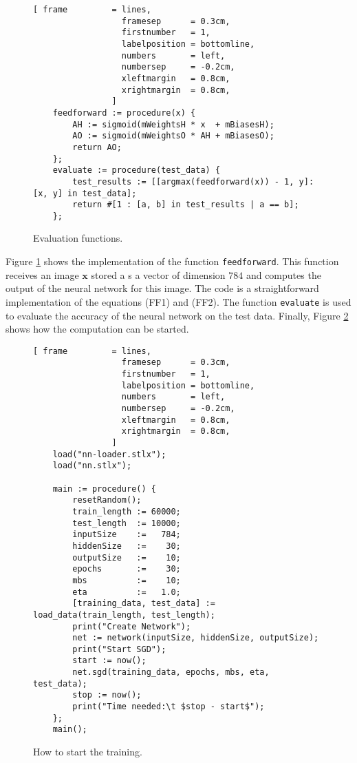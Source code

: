 \begin{figure}[!ht]
\centering
\begin{Verbatim}[ frame         = lines, 
                  framesep      = 0.3cm, 
                  firstnumber   = 1,
                  labelposition = bottomline,
                  numbers       = left,
                  numbersep     = -0.2cm,
                  xleftmargin   = 0.8cm,
                  xrightmargin  = 0.8cm,
                ]
    feedforward := procedure(x) {
        AH := sigmoid(mWeightsH * x  + mBiasesH);
        AO := sigmoid(mWeightsO * AH + mBiasesO);
        return AO;
    };
    evaluate := procedure(test_data) {
        test_results := [[argmax(feedforward(x)) - 1, y]: [x, y] in test_data];
        return #[1 : [a, b] in test_results | a == b];
    };
\end{Verbatim}
\vspace*{-0.3cm}
\caption{Evaluation functions.}
\label{fig:nn.stlx:evaluation}
\end{figure}

Figure \ref{fig:nn.stlx:evaluation} shows the implementation of the function \texttt{feedforward}.  This
function receives an image $\mathbf{x}$ stored a s a vector of dimension $784$ and computes the output of the
neural network for this image.  The code is a straightforward implementation of the equations (FF1) and (FF2).
The function \texttt{evaluate} is used to evaluate the accuracy of the neural network on the test data.
Finally, Figure \ref{fig:nn-start.stlx} shows how the computation can be started.

\begin{figure}[!ht]
\centering
\begin{Verbatim}[ frame         = lines, 
                  framesep      = 0.3cm, 
                  firstnumber   = 1,
                  labelposition = bottomline,
                  numbers       = left,
                  numbersep     = -0.2cm,
                  xleftmargin   = 0.8cm,
                  xrightmargin  = 0.8cm,
                ]
    load("nn-loader.stlx");
    load("nn.stlx");
    
    main := procedure() {
        resetRandom();
        train_length := 60000;
        test_length  := 10000;
        inputSize    :=   784;
        hiddenSize   :=    30;
        outputSize   :=    10;
        epochs       :=    30;
        mbs          :=    10;
        eta          :=   1.0;
        [training_data, test_data] := load_data(train_length, test_length);
        print("Create Network");
        net := network(inputSize, hiddenSize, outputSize);
        print("Start SGD");
        start := now();
        net.sgd(training_data, epochs, mbs, eta, test_data);
        stop := now();
        print("Time needed:\t $stop - start$");
    };
    main();
\end{Verbatim}
\vspace*{-0.3cm}
\caption{How to start the training.}
\label{fig:nn-start.stlx}
\end{figure}


